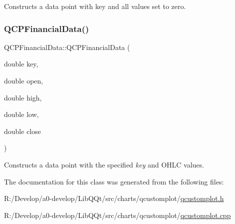 Constructs a data point with key and all values set to zero. \mbox{\label{class_q_c_p_financial_data_a069b72c514dfd4fc8e1d5df811e54ca4}} 
\subsubsection{\texorpdfstring{Q\+C\+P\+Financial\+Data()}{QCPFinancialData()}\hspace{0.1cm}{\footnotesize\ttfamily [2/2]}}
{\footnotesize\ttfamily Q\+C\+P\+Financial\+Data\+::\+Q\+C\+P\+Financial\+Data (\begin{DoxyParamCaption}\item[{double}]{key,  }\item[{double}]{open,  }\item[{double}]{high,  }\item[{double}]{low,  }\item[{double}]{close }\end{DoxyParamCaption})}

Constructs a data point with the specified {\itshape key} and O\+H\+LC values. 

The documentation for this class was generated from the following files\+:\begin{DoxyCompactItemize}
\item 
R\+:/\+Develop/a0-\/develop/\+Lib\+Q\+Qt/src/charts/qcustomplot/\mbox{\hyperlink{qcustomplot_8h}{qcustomplot.\+h}}\item 
R\+:/\+Develop/a0-\/develop/\+Lib\+Q\+Qt/src/charts/qcustomplot/\mbox{\hyperlink{qcustomplot_8cpp}{qcustomplot.\+cpp}}\end{DoxyCompactItemize}
